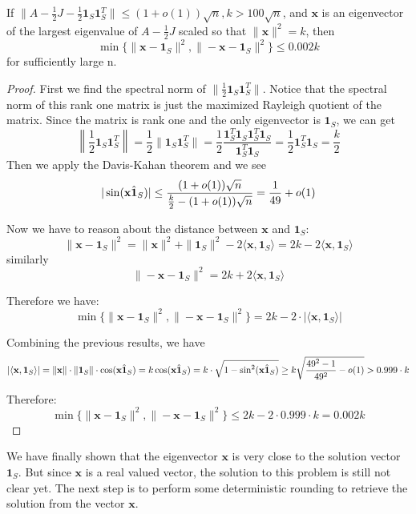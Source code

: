 \documentclass{article}
\begin{document}
\begin{corollary}
If $\|A-\frac{1}{2}J - \frac{1}{2}\mathbf{1}_S\mathbf{1}_S^T\| \leq (1+o(1))\sqrt{n}, k>100\sqrt{n}$, and $\mathbf{x}$ is an eigenvector of the largest eigenvalue of $A-\frac{1}{2}J$ scaled so that $\|\mathbf{x}\|^2=k$, then
$$\min\{\|\mathbf{x}-\mathbf{1}_S\|^2, \|-\mathbf{x}-\mathbf{1}_S\|^2\} \leq 0.002k$$
for sufficiently large n.
\end{corollary}

\begin{proof}
First we find the spectral norm of $\|\frac{1}{2}\mathbf{1}_S\mathbf{1}_S^T\|$.
Notice that the spectral norm of this rank one matrix is just the maximized
Rayleigh quotient of the matrix. Since the matrix is rank one and the only eigenvector is $\mathbf{1}_S$, we can get
$$
\left\|\frac{1}{2}\mathbf{1}_S\mathbf{1}_S^T\right\| = 
\frac{1}{2}\|\mathbf{1}_S\mathbf{1}_S^T\| = 
\dfrac{1}{2}\dfrac{\mathbf{1}_S^T\mathbf{1}_S\mathbf{1}_S^T\mathbf{1}_S}{\mathbf{1}_S^T\mathbf{1}_S} = \dfrac{1}{2}\mathbf{1}_S^T\mathbf{1}_S = \dfrac{k}{2}
$$
Then we apply the Davis-Kahan theorem and we see 
$$|\sin(\Hat{\mathbf{x} \mathbf{1}_S})| \leq \dfrac{(1+o(1))\sqrt{n}}{\frac{k}{2} - (1 + o(1))\sqrt{n}} = \frac{1}{49} + o(1)$$

Now we have to reason about the distance between $\mathbf{x}$ and $\mathbf{1}_S$:
$$\|\mathbf{x} - \mathbf{1}_S\|^2 = \|\mathbf{x}\|^2 + \|\mathbf{1}_S\|^2 - 2 \langle \mathbf{x}, \mathbf{1}_S\rangle = 2k - 2 \langle \mathbf{x}, \mathbf{1}_S\rangle $$
similarly
$$\|- \mathbf{x} - \mathbf{1}_S\|^2 = 2k + 2 \langle \mathbf{x}, \mathbf{1}_S\rangle $$

Therefore we have:
$$\min\{\|\mathbf{x} - \mathbf{1}_S\|^2, \|- \mathbf{x} - \mathbf{1}_S\|^2\} = 2k - 2\cdot |\langle \mathbf{x}, \mathbf{1}_S\rangle|$$

Combining the previous results, we have
$$|\langle \mathbf{x}, \mathbf{1}_S\rangle| = \|\mathbf{x}\|\cdot\|\mathbf{1}_S\|\cdot \cos(\Hat{\mathbf{x}\mathbf{1}_S}) = k \cos(\Hat{\mathbf{x}\mathbf{1}_S}) = k\cdot \sqrt{1 - \sin^2({\Hat{\mathbf{x}\mathbf{1}_S}})} \geq k \sqrt{\dfrac{49^2 - 1}{49^2} - o(1)} > 0.999 \cdot k$$

Therefore:
$$\min\{\|\mathbf{x}-\mathbf{1}_S\|^2, \|-\mathbf{x}-\mathbf{1}_S\|^2\} \leq 2k - 2\cdot 0.999\cdot k = 0.002k$$
\end{proof}

We have finally shown that the eigenvector $\mathbf{x}$ is very close to the
solution vector $\mathbf{1}_S$. But since $\mathbf{x}$ is a real valued vector,
the solution to this problem is still not clear yet. The next step is to
perform some deterministic rounding to retrieve the solution from the vector
$\mathbf{x}$.
\end{document}
